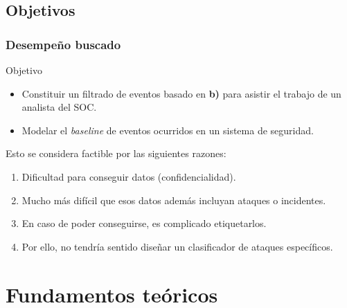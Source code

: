 \subsection{Objetivos}
\watermarkoff
\begin{frame}[t,fragile]
	\frametitle {Desempeño buscado}
	
	\begin{block}{Objetivo}
		\begin{itemize}
			\item Constituir un filtrado de eventos basado en \textbf{b)} para asistir el trabajo de un analista del SOC.
			
			\item Modelar el \textit{baseline} de eventos ocurridos en un sistema de seguridad.
		\end{itemize}	
	\end{block}
	
	\pause
	Esto se considera factible por las siguientes razones:
	
	\begin{enumerate}
		\item Dificultad para conseguir datos (confidencialidad).
		
		\item Mucho más difícil que esos datos además incluyan ataques o incidentes.
		
		\item En caso de poder conseguirse, es complicado etiquetarlos.
		
		\item Por ello, no tendría sentido diseñar un clasificador de ataques específicos.
	\end{enumerate}
	
\end{frame}
\watermarkon


\section{Fundamentos teóricos}


	

